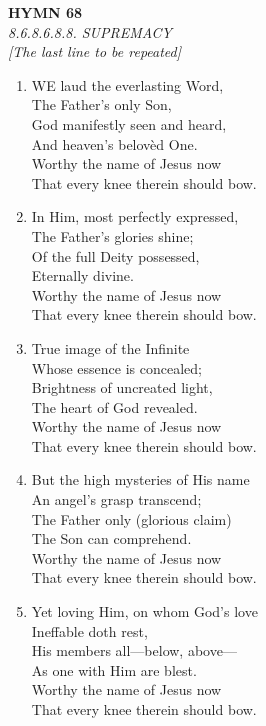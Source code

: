 \documentclass[11pt,a4paper]{article}
\begin{document}
\newpage
\begin{center}
    {\Large \textbf{HYMN 68}}
    \\
    \textit{8.6.8.6.8.8. SUPREMACY}
    \\
    \textit{\small [The last line to be repeated]}
\end{center}
\vspace{1em}

\begin{enumerate}
    \item WE laud the everlasting Word, \\
        The Father's only Son, \\
        God manifestly seen and heard, \\
        And heaven's belov\`ed One. \\
        Worthy the name of Jesus now \\
        That every knee therein should bow.

    \item In Him, most perfectly expressed, \\
        The Father's glories shine; \\
        Of the full Deity possessed, \\
        Eternally divine. \\
        Worthy the name of Jesus now \\
        That every knee therein should bow.

    \item True image of the Infinite \\
        Whose essence is concealed; \\
        Brightness of uncreated light, \\
        The heart of God revealed. \\
        Worthy the name of Jesus now \\
        That every knee therein should bow.

    \item But the high mysteries of His name \\
        An angel's grasp transcend; \\
        The Father only (glorious claim) \\
        The Son can comprehend. \\
        Worthy the name of Jesus now \\
        That every knee therein should bow.

    \item Yet loving Him, on whom God's love \\
        Ineffable doth rest, \\
        His members all---below, above--- \\
        As one with Him are blest. \\
        Worthy the name of Jesus now \\
        That every knee therein should bow.


\end{enumerate}
\end{document}
